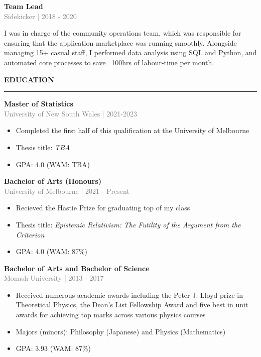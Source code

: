 \documentclass[10pt]{article}
\begin{document}
\vspace{0.5cm}
{\bf Team Lead} \\
\textcolor{gray}{Sidekicker | 2018 - 2020} \\[3pt]
\begin{small}
 I was in charge of the community operations team,  which was responsible for ensuring that the application marketplace was running smoothly. 
 Alongside managing 15+ casual staff, I performed data analysis using SQL and Python, and automated core processes to save ~100hrs of labour-time per month.
\end{small}


\vspace{1cm}
\begin{large}
{\bf EDUCATION} \\
\textcolor{gray}{\rule{2cm}{2mm}}
\end{large}
\vspace{5pt}

{\bf Master of Statistics} \\
\textcolor{gray}{University of New South Wales | 2021-2023}
\begin{small}
\begin{itemize}
  \item Completed the first half of this qualification at the University of Melbourne
  \item Thesis title: \textit{TBA}
  \item GPA: 4.0 (WAM: TBA)
\end{itemize}
\end{small}

\vspace{0.5cm}
{\bf Bachelor of Arts (Honours)} \\
\textcolor{gray}{University of Melbourne | 2021 - Present}
\begin{small}
\begin{itemize}
  \item Recieved the Hastie Prize for graduating top of my class
  \item Thesis title: \textit{Epistemic Relativism: The Futility of the Argument from the Criterion}
  \item GPA: 4.0 (WAM: 87\%)
\end{itemize}
\end{small}

\vspace{0.5cm}
{\bf Bachelor of Arts and Bachelor of Science} \\
\textcolor{gray}{Monash University | 2013 - 2017}
\begin{small}
\begin{itemize}
  \item Received numerous academic awards including the Peter J. Lloyd prize in Theoretical Physics, 
    the Dean's List Fellowship Award and five best in unit awards for achieving top marks across various physics courses
  \item Majors (minors): Philosophy (Japanese) and Physics (Mathematics)
  \item GPA: 3.93 (WAM: 87\%)
\end{itemize}
\end{small}
\end{document}
